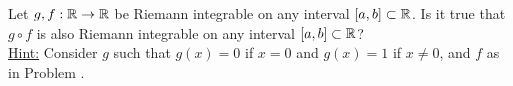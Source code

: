 \begin{problem}
  Let $g, f : \mathbb{R} \to \mathbb{R}$ be Riemann integrable on any interval $[a, b] \subset \mathbb{R}$.
  Is it true that $g \circ f$ is also Riemann integrable on any interval $[a, b] \subset \mathbb{R}$?\\
  \underline{Hint:} Consider $g$ such that $g(x) = 0$ if $x = 0$
  and $g(x) = 1$ if $x \neq 0$, and $f$ as in Problem .
\end{problem}

\begin{answer}

\end{answer}
